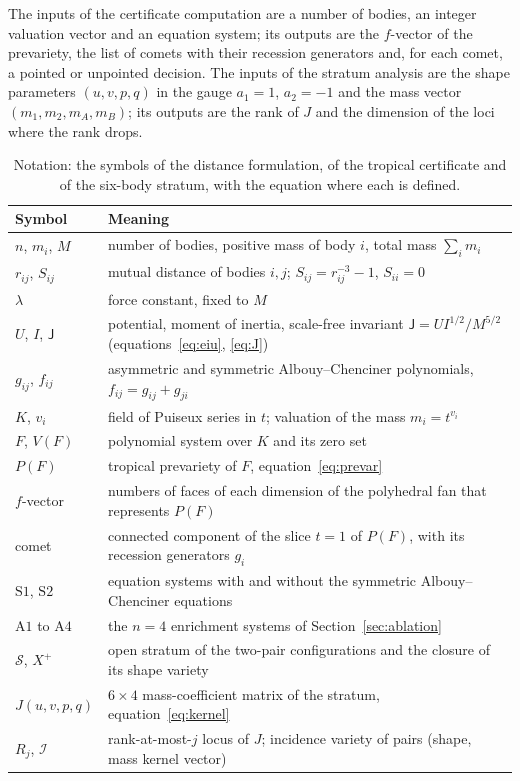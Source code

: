\documentclass[11pt]{article}
\theoremstyle{definition}
\theoremstyle{remark}
\begin{document}
The inputs of the certificate computation are a number of bodies, an integer valuation vector and an equation system; its outputs are the $f$-vector of the
prevariety, the list of comets with their recession generators and, for each comet, a pointed or unpointed decision. The inputs of the stratum analysis are the shape parameters
$(u,v,p,q)$ in the gauge $a_1=1$, $a_2=-1$ and the mass vector $(m_1,m_2,m_A,m_B)$; its outputs are the rank of $J$ and the dimension of the loci where the rank drops.

\begin{table}[t]\centering\footnotesize
\begin{tabular}{@{}L{2.2cm}L{9.6cm}@{}}
\toprule
Symbol & Meaning \\
\midrule
$n$, $m_i$, $M$ & number of bodies, positive mass of body $i$, total mass $\sum_i m_i$ \\
$r_{ij}$, $S_{ij}$ & mutual distance of bodies $i,j$; $S_{ij}=r_{ij}^{-3}-1$, $S_{ii}=0$ \\
$\lambda$ & force constant, fixed to $M$ \\
$U$, $I$, $\mathsf J$ & potential, moment of inertia, scale-free invariant $\mathsf J=UI^{1/2}/M^{5/2}$ (equations~\eqref{eq:eiu}, \eqref{eq:J}) \\
$g_{ij}$, $f_{ij}$ & asymmetric and symmetric Albouy--Chenciner polynomials, $f_{ij}=g_{ij}+g_{ji}$ \\
$K$, $v_i$ & field of Puiseux series in $t$; valuation of the mass $m_i=t^{v_i}$ \\
$F$, $V(F)$ & polynomial system over $K$ and its zero set \\
$P(F)$ & tropical prevariety of $F$, equation~\eqref{eq:prevar} \\
$f$-vector & numbers of faces of each dimension of the polyhedral fan that represents $P(F)$ \\
comet & connected component of the slice $t=1$ of $P(F)$, with its recession generators $g_i$ \\
$\mathrm{S1}$, $\mathrm{S2}$ & equation systems with and without the symmetric Albouy--Chenciner equations \\
$\mathrm{A1}$ to $\mathrm{A4}$ & the $n=4$ enrichment systems of Section~\ref{sec:ablation} \\
$\mathcal S$, $X^{+}$ & open stratum of the two-pair configurations and the closure of its shape variety \\
$J(u,v,p,q)$ & $6\times4$ mass-coefficient matrix of the stratum, equation~\eqref{eq:kernel} \\
$R_j$, $\mathcal I$ & rank-at-most-$j$ locus of $J$; incidence variety of pairs (shape, mass kernel vector) \\
\bottomrule
\end{tabular}
\caption{Notation: the symbols of the distance formulation, of the tropical certificate and of the six-body stratum, with the
equation where each is defined.}\label{tab:notation}
\end{table}
\end{document}
